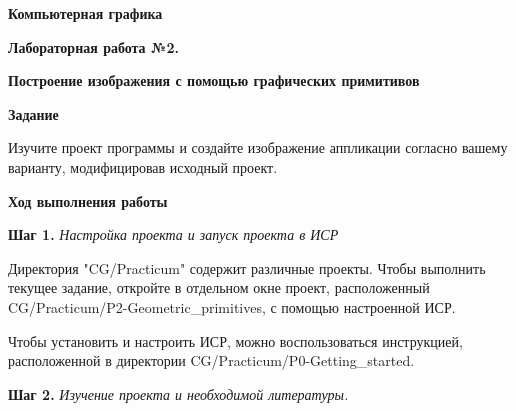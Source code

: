 \documentclass[a4paper,12pt]{article}
\begin{document}
\fontsize{14pt}{16pt}\selectfont
\begin{center}
    \textbf{{\Large Компьютерная графика}}
    
    \textbf{{\large Лабораторная работа №2. }}
    
    \textbf{{\large Построение изображения с помощью графических примитивов}}
    \end{center}
    
    
    \textbf{Задание}
    
    Изучите проект программы и создайте изображение аппликации согласно вашему варианту, модифицировав исходный проект.
    
    
    
    \textbf{Ход выполнения работы}
    
    \textbf{Шаг 1.} \textit{Настройка проекта и запуск проекта в ИСР}
    
    Директория "CG/Practicum" содержит различные проекты. Чтобы выполнить текущее задание, откройте в отдельном окне проект, расположенный \textquotedbl CG/Practicum/P2-Geometric\_primitives\textquotedbl, с помощью настроенной ИСР.

    Чтобы установить и настроить ИСР, можно воспользоваться инструкцией, расположенной в директории 
    \textquotedbl CG/Practicum/P0-Getting\_started\textquotedbl .



    
    
    
    \textbf{Шаг 2.} \textit{Изучение проекта и необходимой литературы.}
    
\end{document}
